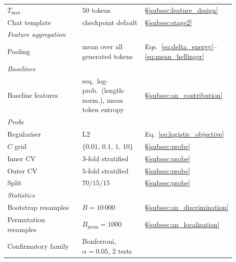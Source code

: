 \begin{table}[H]
\begin{tabular}{p{0.36\linewidth} p{0.28\linewidth} p{0.28\linewidth}}
        \hspace{1em}$T_{\max}$
            & $50$ tokens
            & \S\ref{subsec:feature_design} \\
        \hspace{1em}Chat template
            & checkpoint default
            & \S\ref{subsec:stage2} \\
        \multicolumn{3}{l}{\emph{Feature aggregation}} \\
        \hspace{1em}Pooling
            & mean over all generated tokens
            & Eqs.~\eqref{eq:delta_energy}--\eqref{eq:mean_hellinger} \\
        \multicolumn{3}{l}{\emph{Baselines}} \\
        \hspace{1em}Baseline features
            & seq.\ log-prob.\ (length-norm.), mean token entropy
            & \S\ref{subsec:an_contribution} \\
        \multicolumn{3}{l}{\emph{Probe}} \\
        \hspace{1em}Regulariser
            & L2
            & Eq.~\eqref{eq:logistic_objective} \\
        \hspace{1em}$C$ grid
            & $\{0.01,\,0.1,\,1,\,10\}$
            & \S\ref{subsec:probe} \\
        \hspace{1em}Inner CV
            & $3$-fold stratified
            & \S\ref{subsec:probe} \\
        \hspace{1em}Outer CV
            & $5$-fold stratified
            & \S\ref{subsec:probe} \\
        \hspace{1em}Split
            & $70/15/15$
            & \S\ref{subsec:probe} \\
        \multicolumn{3}{l}{\emph{Statistics}} \\
        \hspace{1em}Bootstrap resamples
            & $B = 10\,000$
            & \S\ref{subsec:an_discrimination} \\
        \hspace{1em}Permutation resamples
            & $B_{\mathrm{perm}} = 1000$
            & \S\ref{subsec:an_localisation} \\
        \hspace{1em}Confirmatory family
            & Bonferroni, $\alpha{=}0.05$, $2$ tests

\end{tabular}
\end{table}
